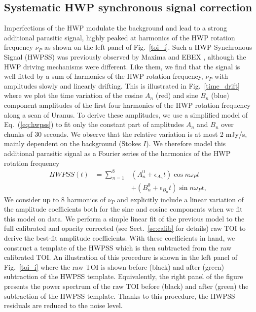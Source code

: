 \documentclass[twocolumn, traditabstract]{aa}
\begin{document}
\subsection{Systematic HWP synchronous signal correction}
\label{se:hwpss}
Imperfections of the HWP modulate the background and lead to a strong
additional parasitic signal, highly peaked at harmonics of the HWP rotation
frequency $\nu_P$ as shown on the left panel of Fig.~\ref{toi_i}. Such a HWP
Synchronous Signal (HWPSS) was previously observed by Maxima \citep{johnson2007}
and EBEX \citep{ebex}, although the HWP driving mechanisms were
  different. Like them, we find that the signal is well fitted by a sum of
harmonics of the HWP rotation frequency, $\nu_P$ with amplitudes slowly and
linearly drifting. This is illustrated in Fig.~\ref{time_drift} where we plot
the time variation of the cosine $A_n$ (red) and sine $B_n$ (blue) component
amplitudes of the first four harmonics of the HWP rotation frequency along a scan of Uranus. To derive these amplitudes, we use a simplified model of Eq.~(\ref{eq:hwpss}) to fit only the constant part of amplitudes $A_n$ and $B_n$ over chunks of 30 seconds. We observe that the relative
variation is at most 2 mJy/s, mainly dependent on the background (Stokes $I$). 
We therefore model this additional parasitic signal as a Fourier series of 
the harmonics of the HWP rotation frequency
\begin{eqnarray}
HWPSS(t) &= \sum_{n=1}^{8}& (A_n^0 + \epsilon_{A_n}t)\cos n\omega_Pt\nonumber\\
&& + (B_n^0 + \epsilon_{B_n}t)\sin n\omega_Pt,
\label{eq:hwpss}
\end{eqnarray}
We consider up to 8 harmonics of $\nu_{P}$ and explicitly include a linear variation of the
amplitude coefficients both for the sine and cosine components when we fit this model on data.
We perform a simple linear fit of the previous model to the full calibrated and
opacity corrected (see Sect.~\ref{se:calib} for details) raw TOI to derive the
best-fit amplitude coefficients. With these coefficients in hand, we
construct a template of the HWPSS which is then subtracted from the raw
calibrated TOI. An illustration of this procedure is shown in the left panel of
Fig.~\ref{toi_i} where the raw TOI is shown before (black) and after (green)
subtraction of the HWPSS template. Equivalently, the right panel of the figure
presents the power spectrum of the raw TOI before (black) and after (green) the
subtraction of the HWPSS template. Thanks to this procedure, the
HWPSS residuals are reduced to the noise level.
\end{document}
